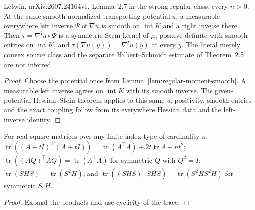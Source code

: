\begin{lemma}
  \label{lem:regular-smooth-moment-stein}
  \leanok
  Letwin, arXiv:2607.24164v1, Lemma~2.7 in the strong regular class, every $n>0$.
  At the same smooth normalized transporting potential $u$, a measurable everywhere left
  inverse $\Psi$ of $\nabla u$ is smooth on $\operatorname{int}K$ and a right inverse there.
  Then $\tau=\nabla^2u\circ\Psi$ is a symmetric Stein kernel of $\mu$, positive definite with
  smooth entries on $\operatorname{int}K$, and $\tau(\nabla u(y))=\nabla^2u(y)$ at every $y$.
  The literal merely convex source class and the separate Hilbert--Schmidt estimate of
  Theorem~2.5 are not inferred.
\end{lemma}
\begin{proof}
  \leanok
  Choose the potential once from Lemma~\ref{lem:regular-moment-smooth}. A measurable left
  inverse agrees on $\operatorname{int}K$ with its smooth inverse. The given-potential
  Hessian--Stein theorem applies to this same $u$; positivity, smooth entries and the exact
  coupling follow from its everywhere Hessian data and the left-inverse identity.
\end{proof}

\begin{lemma}
  \label{lem:matrix-noise-trace-identities}
  \leanok
  For real square matrices over any finite index type of cardinality $n$:
  $\operatorname{tr}((A+t I)^{\top}(A+t I))=\operatorname{tr}(A^{\top}A)+2t\operatorname{tr}A+nt^2$;
  $\operatorname{tr}((AQ)^{\top}AQ)=\operatorname{tr}(A^{\top}A)$ for symmetric $Q$ with $Q^2=I$;
  $\operatorname{tr}(SHS)=\operatorname{tr}(S^2H)$; and $\operatorname{tr}((SHS)^{\top}SHS)=\operatorname{tr}(S^2HS^2H)$ for
  symmetric $S,H$.
\end{lemma}
\begin{proof}
  \leanok
  Expand the products and use cyclicity of the trace.
\end{proof}

